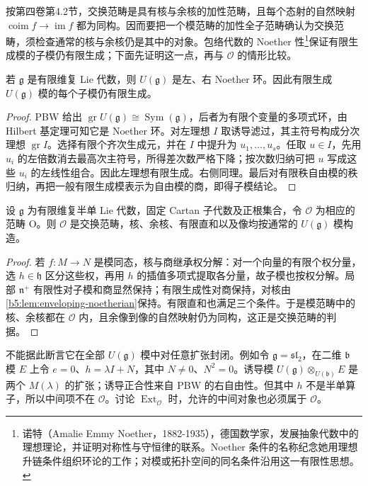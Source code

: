 按第四卷第4.2节，交换范畴是具有核与余核的加性范畴，且每个态射的自然映射 \(\operatorname{coim}f\to\operatorname{im}f\) 都为同构。因而要把一个模范畴的加性全子范畴确认为交换范畴，须检查通常的核与余核仍是其中的对象。包络代数的 Noether 性\footnote{诺特（Amalie Emmy Noether，1882-1935），德国数学家，发展抽象代数中的理想理论，并证明对称性与守恒律的联系。Noether 条件的名称纪念她用理想升链条件组织环论的工作；对模或拓扑空间的同名条件沿用这一有限性思想。}保证有限生成模的子模仍有限生成；下面先证明这一点，再与 \(\mathcal O\) 的情形比较。

\begin{lemma}\label{b5:lem:enveloping-noetherian}
	若 \(\mathfrak g\) 是有限维复 Lie 代数，则 \(U(\mathfrak g)\) 是左、右 Noether 环。因此有限生成 \(U(\mathfrak g)\) 模的每个子模仍有限生成。
\end{lemma}
\begin{proof}
	PBW 给出 \(\operatorname{gr}U(\mathfrak g)\cong\operatorname{Sym}(\mathfrak g)\)，后者为有限个变量的多项式环，由 Hilbert 基定理可知它是 Noether 环。对左理想 \(I\) 取诱导滤过，其主符号构成分次理想 \(\operatorname{gr}I\)。选择有限个齐次生成元，并在 \(I\) 中提升为 \(u_1,\ldots,u_s\)。任取 \(u\in I\)，先用 \(u_i\) 的左倍数消去最高次主符号，所得差次数严格下降；按次数归纳可把 \(u\) 写成这些 \(u_i\) 的左线性组合。因此左理想有限生成。右侧同理。最后对有限秩自由模的秩归纳，再把一般有限生成模表示为自由模的商，即得子模结论。
\end{proof}

\begin{proposition}\label{b5:prop:o-abelian}
	设 \(\mathfrak g\) 为有限维复半单 Lie 代数，固定 Cartan 子代数及正根集合，令 \(\mathcal O\) 为相应的范畴 O。则 \(\mathcal O\) 是交换范畴，核、余核、有限直和以及像均按通常的 \(U(\mathfrak g)\) 模构造。
\end{proposition}
\begin{proof}
	若 \(f:M\to N\) 是模同态，核与商继承权分解：对一个向量的有限个权分量，选 \(h\in\mathfrak h\) 区分这些权，再用 \(h\) 的插值多项式提取各分量，故子模也按权分解。局部 \(\mathfrak n^+\) 有限性对子模和商显然保持；有限生成性对商保持，对核由\cref{b5:lem:enveloping-noetherian}保持。有限直和也满足三个条件。于是模范畴中的核、余核都在 \(\mathcal O\) 内，且余像到像的自然映射仍为同构，这正是交换范畴的判据。
\end{proof}

不能据此断言它在全部 \(U(\mathfrak g)\) 模中对任意扩张封闭。例如令 \(\mathfrak g=\mathfrak{sl}_2\)，在二维 \(\mathfrak b\) 模 \(E\) 上令 \(e=0\)、\(h=\lambda I+N\)，其中 \(N\ne0\)、\(N^2=0\)。诱导模 \(U(\mathfrak g)\otimes_{U(\mathfrak b)}E\) 是两个 \(M(\lambda)\) 的扩张；诱导正合性来自 PBW 的右自由性。但其中 \(h\) 不是半单算子，所以中间项不在 \(\mathcal O\)。讨论 \(\operatorname{Ext}_{\mathcal O}\) 时，允许的中间对象也必须属于 \(\mathcal O\)。
